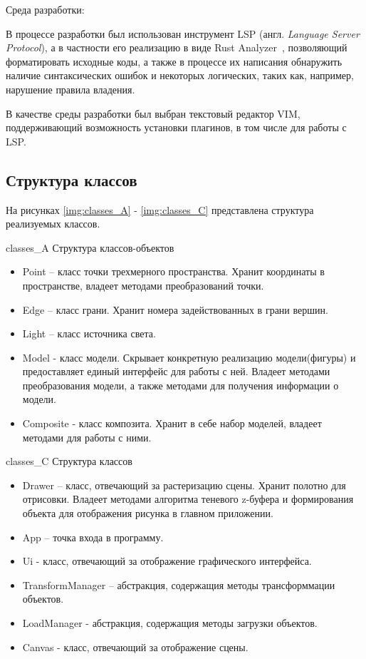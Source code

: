 Среда разработки:

В процессе разработки был использован инструмент LSP\cite{lsp} (англ. \textit{Language Server Protocol}), а в частности его реализацию в виде Rust Analyzer~\cite{rust-anal}, позволяющий форматировать исходные коды, а также в процессе их написания обнаружить наличие синтаксических ошибок и некоторых логических, таких как, например, нарушение правила владения\cite{rust-learn}.

В качестве среды разработки был выбран текстовый редактор VIM\cite{vim}, поддерживающий возможность установки плагинов\cite{vim-plugins}, в том числе для работы с LSP\cite{lsp}.
\subsection{Структура классов}

На рисунках \ref{img:classes_A} - \ref{img:classes_C} представлена структура реализуемых классов.

\img{100mm}
{classes_A} %
{Структура классов-объектов} %

\begin{itemize}
    \item Point – класс точки трехмерного пространства. Хранит координаты в пространстве, владеет методами преобразований точки.
    \item Edge – класс грани. Хранит номера задействованных в грани вершин.
    \item Light – класс источника света.
    \item Model - класс модели. Скрывает конкретную реализацию модели(фигуры) и предоставляет единый интерфейс для работы с ней. Владеет методами преобразования модели, а также методами для получения информации о модели.
    \item Composite - класс композита. Хранит в себе набор моделей, владеет методами для работы с ними.
\end{itemize}

\img{100mm}
{classes_C} %
{Структура классов} %

\begin{itemize}
    \item Drawer – класс, отвечающий за растеризацию сцены. Хранит полотно для отрисовки. Владеет методами алгоритма теневого z-буфера и формирования объекта для отображения рисунка в главном приложении.
    \item App – точка входа в программу.
    \item Ui - класс, отвечающий за отображение графического интерфейса.
    \item TransformManager – абстракция, содержащия методы трансформмации объектов.
    \item LoadManager - абстракция, содержащия методы загрузки объектов.
    \item Canvas - класс, отвечающий за отображение сцены.
\end{itemize}
